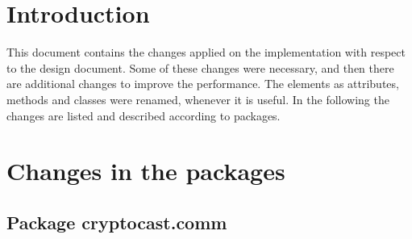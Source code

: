 \documentclass[a4paper,10pt]{scrartcl}
\title{\doctitle}
\author{\authorName}
\date{\today}
\begin{document}

\tableofcontents
\clearpage

\section{Introduction}
This document contains the changes applied on the implementation with respect to the design document.
Some of these changes were necessary, and then there are additional changes to improve the performance.
The elements as attributes, methods and classes were renamed, whenever it is useful. In the following the 
changes are listed and described according to packages.

\section{Changes in the packages}
\subsection{Package cryptocast.comm}
\end{document}
